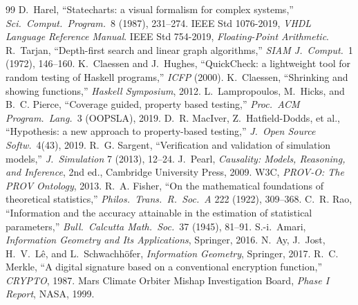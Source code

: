 \begin{thebibliography}{99}
 D.~Harel, ``Statecharts: a visual formalism for complex systems,'' \emph{Sci.\ Comput.\ Program.}\ 8 (1987), 231--274.
 IEEE Std 1076-2019, \emph{VHDL Language Reference Manual}.
 IEEE Std 754-2019, \emph{Floating-Point Arithmetic}.
 R.~Tarjan, ``Depth-first search and linear graph algorithms,'' \emph{SIAM J.\ Comput.}\ 1 (1972), 146--160.
 K.~Claessen and J.~Hughes, ``QuickCheck: a lightweight tool for random testing of Haskell programs,'' \emph{ICFP} (2000).
 K.~Claessen, ``Shrinking and showing functions,'' \emph{Haskell Symposium}, 2012.
 L.~Lampropoulos, M.~Hicks, and B.~C. Pierce, ``Coverage guided, property based testing,'' \emph{Proc.\ ACM Program.\ Lang.}\ 3 (OOPSLA), 2019.
 D.~R. MacIver, Z.~Hatfield-Dodds, et al., ``Hypothesis: a new approach to property-based testing,'' \emph{J.\ Open Source Softw.}\ 4(43), 2019.
 R.~G. Sargent, ``Verification and validation of simulation models,'' \emph{J.\ Simulation} 7 (2013), 12--24.
 J.~Pearl, \emph{Causality: Models, Reasoning, and Inference}, 2nd ed., Cambridge University Press, 2009.
 W3C, \emph{PROV-O: The PROV Ontology}, 2013.
 R.~A. Fisher, ``On the mathematical foundations of theoretical statistics,'' \emph{Philos.\ Trans.\ R.\ Soc.\ A} 222 (1922), 309--368.
 C.~R. Rao, ``Information and the accuracy attainable in the estimation of statistical parameters,'' \emph{Bull.\ Calcutta Math.\ Soc.}\ 37 (1945), 81--91.
 S.-i.~Amari, \emph{Information Geometry and Its Applications}, Springer, 2016.
 N.~Ay, J.~Jost, H.~V.~L\^e, and L.~Schwachh\"ofer, \emph{Information Geometry}, Springer, 2017.
 R.~C. Merkle, ``A digital signature based on a conventional encryption function,'' \emph{CRYPTO}, 1987.
 Mars Climate Orbiter Mishap Investigation Board, \emph{Phase I Report}, NASA, 1999.
\end{thebibliography}
